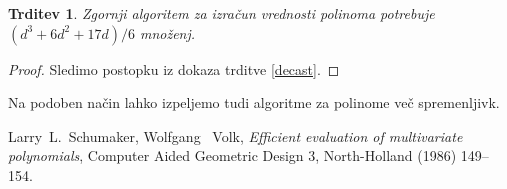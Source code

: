 \documentclass{article}
\newtheorem{trditev}{Trditev}[section]
\begin{document}
\begin{trditev}
Zgornji algoritem za izračun vrednosti polinoma potrebuje $(d^3+ 6d^2 + 17d)/6$ množenj.
\end{trditev}

\begin{proof}
Sledimo postopku iz dokaza trditve \ref{decast}.
\end{proof}

Na podoben način lahko izpeljemo tudi algoritme za polinome več spremenljivk.


\begin{thebibliography}{9}

Larry~L.~Schumaker, Wolfgang ~Volk, \emph{Efficient evaluation of multivariate
polynomials}, Computer Aided Geometric Design 3, North-Holland (1986) 149--154.

\end{thebibliography}
\end{document}
